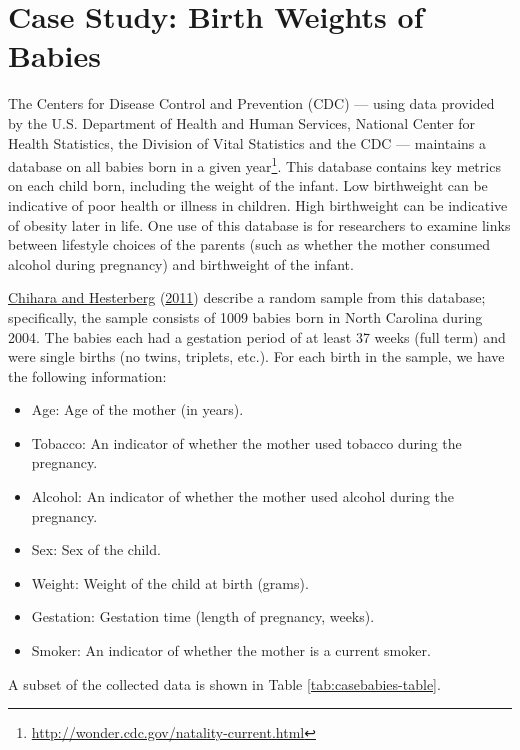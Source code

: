 \documentclass[
]{book}
\providecommand{\tightlist}{%
  \setlength{\itemsep}{0pt}\setlength{\parskip}{0pt}}
\theoremstyle{plain}
\theoremstyle{mydefn}
\theoremstyle{myexmpl}
\theoremstyle{remark}
\begin{document}
\hypertarget{CaseBabies}{%
\chapter{Case Study: Birth Weights of Babies}\label{CaseBabies}}

The Centers for Disease Control and Prevention (CDC) --- using data provided by the U.S. Department of Health and Human Services, National Center for Health Statistics, the Division of Vital Statistics and the CDC --- maintains a database on all babies born in a given year\footnote{\url{http://wonder.cdc.gov/natality-current.html}}. This database contains key metrics on each child born, including the weight of the infant. Low birthweight can be indicative of poor health or illness in children. High birthweight can be indicative of obesity later in life. One use of this database is for researchers to examine links between lifestyle choices of the parents (such as whether the mother consumed alcohol during pregnancy) and birthweight of the infant.

\protect\hyperlink{ref-Chihara2011}{Chihara and Hesterberg} (\protect\hyperlink{ref-Chihara2011}{2011}) describe a random sample from this database; specifically, the sample consists of 1009 babies born in North Carolina during 2004. The babies each had a gestation period of at least 37 weeks (full term) and were single births (no twins, triplets, etc.). For each birth in the sample, we have the following information:

\begin{itemize}
\tightlist
\item
  Age: Age of the mother (in years).
\item
  Tobacco: An indicator of whether the mother used tobacco during the pregnancy.
\item
  Alcohol: An indicator of whether the mother used alcohol during the pregnancy.
\item
  Sex: Sex of the child.
\item
  Weight: Weight of the child at birth (grams).
\item
  Gestation: Gestation time (length of pregnancy, weeks).
\item
  Smoker: An indicator of whether the mother is a current smoker.
\end{itemize}

A subset of the collected data is shown in Table \ref{tab:casebabies-table}.
\end{document}
